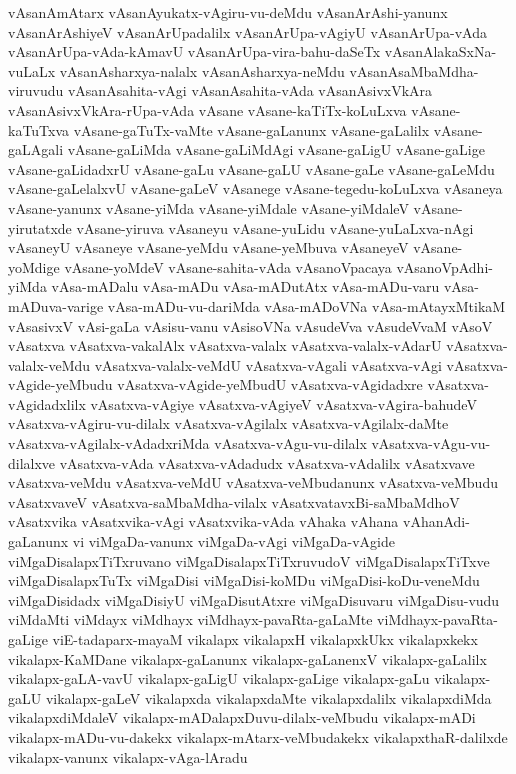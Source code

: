 {vAsanAmAtarx
vAsanAyukatx-vAgiru-vu-deMdu
vAsanArAshi-yanunx
vAsanArAshiyeV
vAsanArUpadalilx
vAsanArUpa-vAgiyU
vAsanArUpa-vAda
vAsanArUpa-vAda-kAmavU
vAsanArUpa-vira-bahu-daSeTx
vAsanAlakaSxNa-vuLaLx
vAsanAsharxya-nalalx
vAsanAsharxya-neMdu
vAsanAsaMbaMdha-viruvudu
vAsanAsahita-vAgi
vAsanAsahita-vAda
vAsanAsivxVkAra
vAsanAsivxVkAra-rUpa-vAda
vAsane
vAsane-kaTiTx-koLuLxva
vAsane-kaTuTxva
vAsane-gaTuTx-vaMte
vAsane-gaLanunx
vAsane-gaLalilx
vAsane-gaLAgali
vAsane-gaLiMda
vAsane-gaLiMdAgi
vAsane-gaLigU
vAsane-gaLige
vAsane-gaLidadxrU
vAsane-gaLu
vAsane-gaLU
vAsane-gaLe
vAsane-gaLeMdu
vAsane-gaLelalxvU
vAsane-gaLeV
vAsanege
vAsane-tegedu-koLuLxva
vAsaneya
vAsane-yanunx
vAsane-yiMda
vAsane-yiMdale
vAsane-yiMdaleV
vAsane-yirutatxde
vAsane-yiruva
vAsaneyu
vAsane-yuLidu
vAsane-yuLaLxva-nAgi
vAsaneyU
vAsaneye
vAsane-yeMdu
vAsane-yeMbuva
vAsaneyeV
vAsane-yoMdige
vAsane-yoMdeV
vAsane-sahita-vAda
vAsanoVpacaya
vAsanoVpAdhi-yiMda
vAsa-mADalu
vAsa-mADu
vAsa-mADutAtx
vAsa-mADu-varu
vAsa-mADuva-varige
vAsa-mADu-vu-dariMda
vAsa-mADoVNa
vAsa-mAtayxMtikaM
vAsasivxV
vAsi-gaLa
vAsisu-vanu
vAsisoVNa
vAsudeVva
vAsudeVvaM
vAsoV
vAsatxva
vAsatxva-vakalAlx
vAsatxva-valalx
vAsatxva-valalx-vAdarU
vAsatxva-valalx-veMdu
vAsatxva-valalx-veMdU
vAsatxva-vAgali
vAsatxva-vAgi
vAsatxva-vAgide-yeMbudu
vAsatxva-vAgide-yeMbudU
vAsatxva-vAgidadxre
vAsatxva-vAgidadxlilx
vAsatxva-vAgiye
vAsatxva-vAgiyeV
vAsatxva-vAgira-bahudeV
vAsatxva-vAgiru-vu-dilalx
vAsatxva-vAgilalx
vAsatxva-vAgilalx-daMte
vAsatxva-vAgilalx-vAdadxriMda
vAsatxva-vAgu-vu-dilalx
vAsatxva-vAgu-vu-dilalxve
vAsatxva-vAda
vAsatxva-vAdadudx
vAsatxva-vAdalilx
vAsatxvave
vAsatxva-veMdu
vAsatxva-veMdU
vAsatxva-veMbudanunx
vAsatxva-veMbudu
vAsatxvaveV
vAsatxva-saMbaMdha-vilalx
vAsatxvatavxBi-saMbaMdhoV
vAsatxvika
vAsatxvika-vAgi
vAsatxvika-vAda
vAhaka
vAhana
vAhanAdi-gaLanunx
vi
viMgaDa-vanunx
viMgaDa-vAgi
viMgaDa-vAgide
viMgaDisalapxTiTxruvano
viMgaDisalapxTiTxruvudoV
viMgaDisalapxTiTxve
viMgaDisalapxTuTx
viMgaDisi
viMgaDisi-koMDu
viMgaDisi-koDu-veneMdu
viMgaDisidadx
viMgaDisiyU
viMgaDisutAtxre
viMgaDisuvaru
viMgaDisu-vudu
viMdaMti
viMdayx
viMdhayx
viMdhayx-pavaRta-gaLaMte
viMdhayx-pavaRta-gaLige
viE-tadaparx-mayaM
vikalapx
vikalapxH
vikalapxkUkx
vikalapxkekx
vikalapx-KaMDane
vikalapx-gaLanunx
vikalapx-gaLanenxV
vikalapx-gaLalilx
vikalapx-gaLA-vavU
vikalapx-gaLigU
vikalapx-gaLige
vikalapx-gaLu
vikalapx-gaLU
vikalapx-gaLeV
vikalapxda
vikalapxdaMte
vikalapxdalilx
vikalapxdiMda
vikalapxdiMdaleV
vikalapx-mADalapxDuvu-dilalx-veMbudu
vikalapx-mADi
vikalapx-mADu-vu-dakekx
vikalapx-mAtarx-veMbudakekx
vikalapxthaR-dalilxde
vikalapx-vanunx
vikalapx-vAga-lAradu
}
